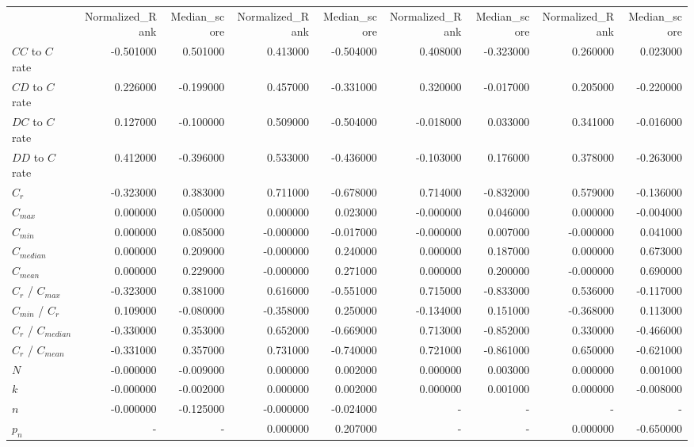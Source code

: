 \begin{tabular}{lrrrrrrrr}
 & Normalized_Rank & Median_score & Normalized_Rank & Median_score & Normalized_Rank & Median_score & Normalized_Rank & Median_score \\
$CC$ to $C$ rate & -0.501000 & 0.501000 & 0.413000 & -0.504000 & 0.408000 & -0.323000 & 0.260000 & 0.023000 \\
$CD$ to $C$ rate & 0.226000 & -0.199000 & 0.457000 & -0.331000 & 0.320000 & -0.017000 & 0.205000 & -0.220000 \\
$DC$ to $C$ rate & 0.127000 & -0.100000 & 0.509000 & -0.504000 & -0.018000 & 0.033000 & 0.341000 & -0.016000 \\
$DD$ to $C$ rate & 0.412000 & -0.396000 & 0.533000 & -0.436000 & -0.103000 & 0.176000 & 0.378000 & -0.263000 \\
$C_r$ & -0.323000 & 0.383000 & 0.711000 & -0.678000 & 0.714000 & -0.832000 & 0.579000 & -0.136000 \\
$C_{max}$ & 0.000000 & 0.050000 & 0.000000 & 0.023000 & -0.000000 & 0.046000 & 0.000000 & -0.004000 \\
$C_{min}$ & 0.000000 & 0.085000 & -0.000000 & -0.017000 & -0.000000 & 0.007000 & -0.000000 & 0.041000 \\
$C_{median}$ & 0.000000 & 0.209000 & -0.000000 & 0.240000 & 0.000000 & 0.187000 & 0.000000 & 0.673000 \\
$C_{mean}$ & 0.000000 & 0.229000 & -0.000000 & 0.271000 & 0.000000 & 0.200000 & -0.000000 & 0.690000 \\
$C_r$ / $C_{max}$  & -0.323000 & 0.381000 & 0.616000 & -0.551000 & 0.715000 & -0.833000 & 0.536000 & -0.117000 \\
$C_{min}$ / $C_r$ & 0.109000 & -0.080000 & -0.358000 & 0.250000 & -0.134000 & 0.151000 & -0.368000 & 0.113000 \\
$C_r$ / $C_{median}$ & -0.330000 & 0.353000 & 0.652000 & -0.669000 & 0.713000 & -0.852000 & 0.330000 & -0.466000 \\
$C_r$ / $C_{mean}$ & -0.331000 & 0.357000 & 0.731000 & -0.740000 & 0.721000 & -0.861000 & 0.650000 & -0.621000 \\
$N$ & -0.000000 & -0.009000 & 0.000000 & 0.002000 & 0.000000 & 0.003000 & 0.000000 & 0.001000 \\
$k$ & -0.000000 & -0.002000 & 0.000000 & 0.002000 & 0.000000 & 0.001000 & 0.000000 & -0.008000 \\
$n$ & -0.000000 & -0.125000 & -0.000000 & -0.024000 & - & - & - & - \\
$p_n$ & - & - & 0.000000 & 0.207000 & - & - & 0.000000 & -0.650000 \\

\end{tabular}
